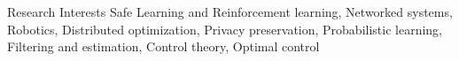 \begin{rSection}{Research Interests}
Safe Learning and Reinforcement learning, Networked systems, Robotics,  Distributed optimization, Privacy preservation, Probabilistic learning, Filtering and estimation, Control theory, Optimal control
\end{rSection}